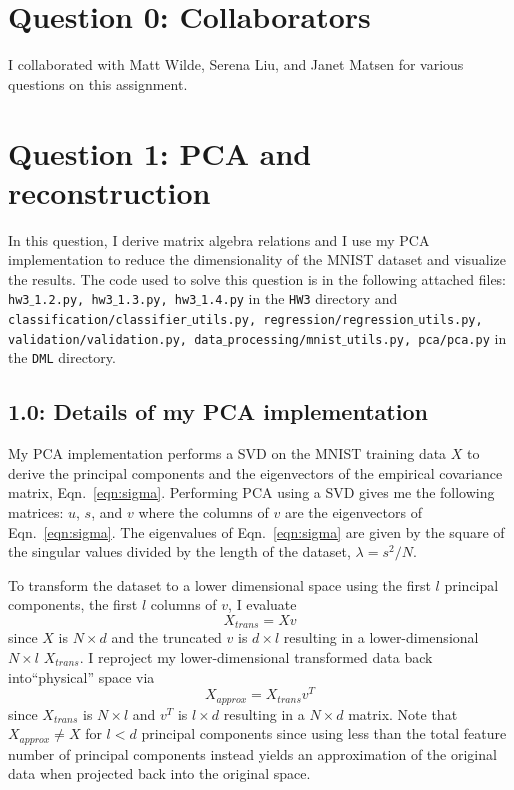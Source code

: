 \documentclass[12pt]{amsart}
\begin{document}
\section*{Question 0: Collaborators}
I collaborated with Matt Wilde, Serena Liu, and Janet Matsen for various questions on this assignment.

\section*{Question 1: PCA and reconstruction}
In this question, I derive matrix algebra relations and I use my PCA implementation to reduce the dimensionality of the MNIST dataset and visualize the results.  The code used to solve this question is in the following attached files: {\tt hw3$\_$1.2.py, hw3$\_$1.3.py, hw3$\_$1.4.py} in the {\tt HW3} directory and {\tt classification/classifier$\_$utils.py, regression/regression$\_$utils.py, validation/validation.py, data$\_$processing/mnist$\_$utils.py, pca/pca.py} in the {\tt DML} directory.

\subsection*{1.0: Details of my PCA implementation}
My PCA implementation performs a SVD on the MNIST training data $X$ to derive the principal components and the eigenvectors of the empirical covariance matrix, Eqn.~\ref{eqn:sigma}.   Performing PCA using a SVD gives me the following matrices: $u$, $s$, and $v$ where the columns of $v$ are the eigenvectors of Eqn.~\ref{eqn:sigma}.  The eigenvalues of Eqn.~\ref{eqn:sigma} are given by the square of the singular values divided by the length of the dataset, $\lambda = s^2/N$.

To transform the dataset to a lower dimensional space using the first $l$ principal components, the first $l$ columns of $v$, I evaluate
\begin{equation} \label{eqn:pca_transform}
X_{trans} = Xv
\end{equation}
since $X$ is $N \times d$ and the truncated $v$ is $d \times l$ resulting in a lower-dimensional $N \times l$ $X_{trans}$.  I reproject my lower-dimensional transformed data back into``physical'' space via
\begin{equation} \label{eqn:pca_inverse_transform}
X_{approx} = X_{trans}v^T
\end{equation} 
since $X_{trans}$ is $N \times l$ and $v^T$ is $l \times d$ resulting in a $N \times d$ matrix.  Note that $X_{approx} \neq X$ for $l < d$ principal components since using less than the total feature number of principal components instead yields an approximation of the original data when projected back into the original space.
\end{document}
